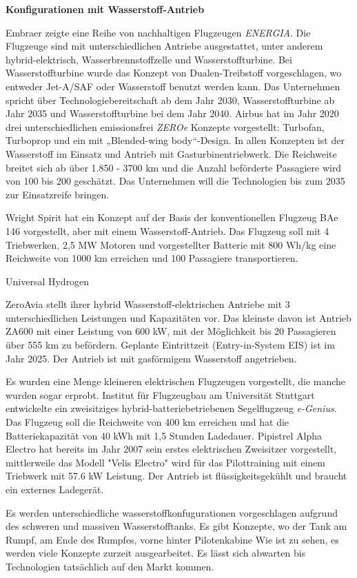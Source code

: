 \textbf{Konfigurationen mit Wasserstoff-Antrieb}

Embraer zeigte eine Reihe von nachhaltigen Flugzeugen \textit{ENERGIA}. Die Flugzeuge sind mit unterschiedlichen Antriebe ausgestattet, unter anderem 
hybrid-elektrisch, Wasserbrennstoffzelle und Wasserstoffturbine. Bei Wasserstoffturbine wurde das Konzept von Dualen-Treibstoff vorgeschlagen, 
wo entweder Jet-A/SAF oder Wasserstoff benutzt werden kann. Das Unternehmen spricht über Technologiebereitschaft ab dem Jahr 2030, Wasserstoffturbine
ab Jahr 2035 und Wasserstoffturbine bei dem Jahr 2040. \cite{embraer_energia_2021}
%
Airbus \cite{airbus_zea_concepts} hat im Jahr 2020 drei unterschiedlichen emissionsfrei \textit{ZEROe} Konzepte vorgestellt: Turbofan, Turboprop 
und ein mit „Blended-wing body“-Design.
In allen Konzepten ist der Wasserstoff im Einsatz und Antrieb mit Gasturbinentriebwerk. Die Reichweite breitet sich ab über 1.850 - 
3700 km und die Anzahl beförderte Passagiere wird von 100 bis 200 geschätzt. Das Unternehmen will die Technologien bis zum 2035 zur Einsatzreife bringen.

Wright Spirit \cite{wright_electric_website} hat ein Konzept auf der Basis der konventionellen Flugzeug BAe 146 vorgestellt, aber mit einem Wasserstoff-Antrieb.
Das Flugzeug soll mit 4 Triebwerken, 2,5 MW Motoren und vorgestellter Batterie mit 800 Wh/kg eine Reichweite von 1000 
km erreichen und 100 Passagiere transportieren.


Universal Hydrogen

ZeroAvia stellt ihrer hybrid Wasserstoff-elektrischen Antriebe mit 3 unterschiedlichen Leistungen und Kapazitäten vor. Das kleinste davon
ist Antrieb ZA600 mit einer Leistung von 600 kW, mit der Möglichkeit bis 20 Passagieren über 555 km zu befördern. 
Geplante Eintrittzeit (Entry-in-System EIS) ist im Jahr 2025. Der Antrieb ist mit gasförmigem Wasserstoff angetrieben.

Es wurden eine Menge kleineren elektrischen Flugzeugen vorgestellt, die manche wurden sogar erprobt.
Institut für Flugzeugbau am Universität Stuttgart entwickelte ein zweisitziges hybrid-batteriebetriebenen Segelflugzeug \textit{e-Genius}. Das Flugzeug soll
die Reichweite von 400 km erreichen und hat die Batteriekapazität von 40 kWh mit 1,5 Stunden Ladedauer. %
Pipistrel  Alpha Electro hat bereits im Jahr 2007 sein erstes elektrischen Zweisitzer vorgestellt, mittlerweile das Modell "Velis Electro" wird
für das Pilottraining mit einem Triebwerk mit 57.6 kW Leistung. Der Antrieb ist flüssigkeitsgekühlt und braucht ein externes Ladegerät.


Es werden unterschiedliche wasserstoffkonfugurationen vorgeschlagen aufgrund des schweren und massiven Wasserstofftanks.
Es gibt Konzepte, wo der Tank am Rumpf, am Ende des Rumpfes, vorne hinter Pilotenkabine
Wie ist zu sehen, es werden viele Konzepte zurzeit ausgearbeitet. Es lässt sich abwarten bis Technologien tatsächlich auf den Markt kommen.